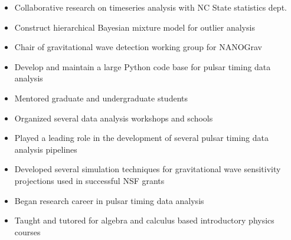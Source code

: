 \documentclass[11pt,letterpaper,sans]{moderncv} %
\begin{document}
\begin{itemize}
\item Collaborative research on timeseries analysis with NC State statistics dept.
\item Construct hierarchical Bayesian mixture model for outlier analysis
\end{itemize}
\vspace{6pt}

\begin{itemize}
\item Chair of gravitational wave detection working group for NANOGrav
\item Develop and maintain a large Python code base for pulsar timing data analysis
\item Mentored graduate and undergraduate students
\item Organized several data analysis workshops and schools
\end{itemize}
\vspace{6pt}

\begin{itemize}
\item Played a leading role in the development of several pulsar timing data analysis pipelines
\item Developed several simulation techniques for gravitational wave sensitivity projections used in successful NSF grants
\end{itemize}
\vspace{6pt}

\begin{itemize}
\item Began research career in pulsar timing data analysis
\item Taught and tutored for algebra and calculus based introductory physics courses

\end{itemize}

\end{document}

